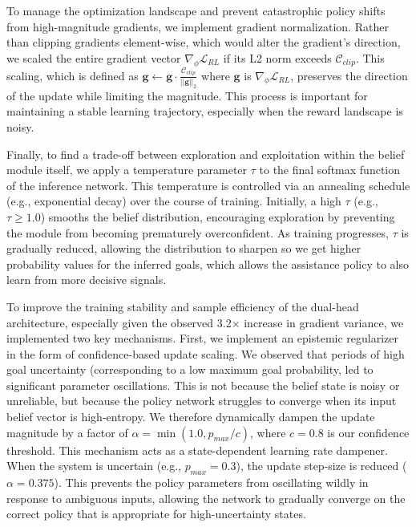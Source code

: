 \documentclass[11pt]{article}
\begin{document}
To manage the optimization landscape and prevent catastrophic policy shifts from high-magnitude gradients, we implement gradient normalization. Rather than clipping gradients element-wise, which would alter the gradient's direction, we scaled the entire gradient vector $\nabla_\phi \mathcal{L}_{RL}$ if its L2 norm exceeds $\mathcal{C}_{clip}$. This scaling, which is defined as $\mathbf{g} \leftarrow \mathbf{g} \cdot \frac{\mathcal{C}_{clip}}{||\mathbf{g}||_2}$ where $\mathbf{g}$ is $\nabla_\phi \mathcal{L}_{RL}$, preserves the direction of the update while limiting the magnitude. This process is important for maintaining a stable learning trajectory, especially when the reward landscape is noisy.

Finally, to find a trade-off between exploration and exploitation within the belief module itself, we apply a temperature parameter $\tau$ to the final softmax function of the inference network. This temperature is controlled via an annealing schedule (e.g., exponential decay) over the course of training. Initially, a high $\tau$ (e.g., $\tau \ge 1.0$) smooths the belief distribution, encouraging exploration by preventing the module from becoming prematurely overconfident. As training progresses, $\tau$ is gradually reduced, allowing the distribution to sharpen so we get higher probability values for the inferred goals, which allows the assistance policy to also learn from more decisive signals.

To improve the training stability and sample efficiency of the dual-head architecture, especially given the observed 3.2$\times$ increase in gradient variance, we implemented two key mechanisms. First, we implement an epistemic regularizer in the form of confidence-based update scaling. We observed that periods of high goal uncertainty (corresponding to a low maximum goal probability, led to significant parameter oscillations. This is not because the belief state is noisy or unreliable, but because the policy network struggles to converge when its input belief vector is high-entropy. We therefore dynamically dampen the update magnitude by a factor of $\alpha = \min(1.0, p_{max} / c)$, where $c=0.8$ is our confidence threshold. This mechanism acts as a state-dependent learning rate dampener. When the system is uncertain (e.g., $p_{max} = 0.3$), the update step-size is reduced ($\alpha = 0.375$). This prevents the policy parameters from oscillating wildly in response to ambiguous inputs, allowing the network to gradually converge on the correct policy that is appropriate for high-uncertainty states.
\end{document}
